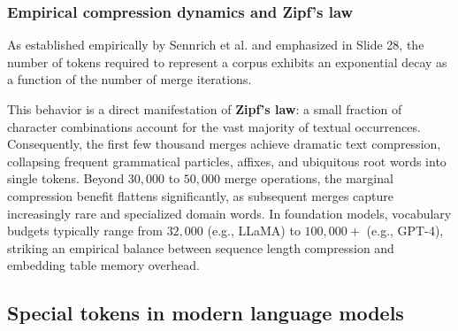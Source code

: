 \documentclass[../../../main.tex]{subfiles}
\begin{document}
\subsubsection{Empirical compression dynamics and Zipf's law}
As established empirically by Sennrich et al. \cite{sennrich2016} and emphasized in Slide 28, the number of tokens required to represent a corpus exhibits an exponential decay as a function of the number of merge iterations.

This behavior is a direct manifestation of \textbf{Zipf's law}: a small fraction of character combinations account for the vast majority of textual occurrences. Consequently, the first few thousand merges achieve dramatic text compression, collapsing frequent grammatical particles, affixes, and ubiquitous root words into single tokens. Beyond $30{,}000$ to $50{,}000$ merge operations, the marginal compression benefit flattens significantly, as subsequent merges capture increasingly rare and specialized domain words. In foundation models, vocabulary budgets typically range from $32{,}000$ (e.g., LLaMA) to $100{,}000+$ (e.g., GPT-4), striking an empirical balance between sequence length compression and embedding table memory overhead.

\subsection{Special tokens in modern language models}
\label{subsec:special_tokens}
\end{document}
